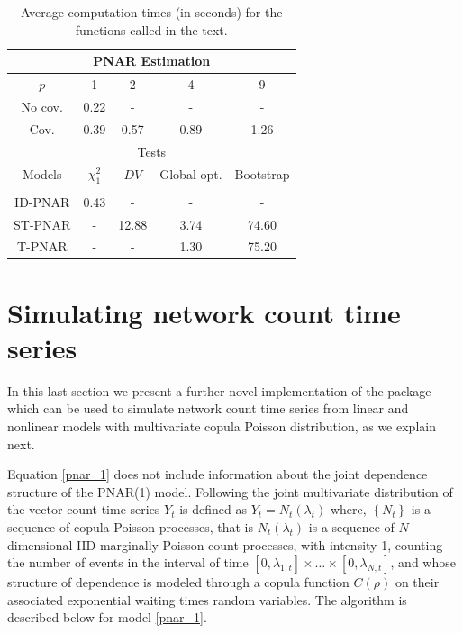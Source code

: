 \begin{table}[H]
	\centering
	\caption{Average computation times (in seconds) for the functions called in the text.}
	\begin{tabular}{ccccc}
		\toprule
		\multicolumn{5}{c}{PNAR Estimation}  \\
		\midrule
		$p$ & 1 & 2 & 4 & 9  \\ %
		\midrule
		No cov. & 0.22  & - & - & - \\
		Cov. & 0.39 & 0.57 & 0.89 & 1.26 \\ %
		\midrule
		\multicolumn{5}{c}{Tests}  \\
		\midrule
		Models & $\chi^2_1$ & $DV$ & Global opt. & Bootstrap \\ \\
		ID-PNAR & 0.43 & - & - & - \\
		ST-PNAR & - & 12.88 & 3.74 & 74.60 \\
		T-PNAR & - & - & 1.30 & 75.20 \\
		\bottomrule
		
	\end{tabular}
	\label{comp_times}
\end{table}


\section{Simulating network count time series}
\label{sec: Generate data}

In this last section we present a further novel implementation of the  package 
which can be used to simulate  network count time series from linear and nonlinear models with multivariate copula Poisson distribution, as we explain next. 

Equation \eqref{pnar_1} does not include information about the joint dependence structure of the PNAR(1) model. 
Following \cite{fok2020} the joint multivariate distribution of the  vector count time series $Y_t$ is defined as $Y_t=N_t(\lambda_t)$ where, $\left\lbrace N_t \right\rbrace $ is a sequence of  copula-Poisson processes, that is   $N_t(\lambda_t)$ is a sequence of $N$-dimensional IID  marginally Poisson count processes, with intensity 1, counting the number of events in the interval of time $[0,\lambda_{1,t}]\times\dots\times[0,\lambda_{N,t}]$, and whose structure of dependence is modeled through a copula function $C(\rho)$ on their associated exponential waiting times random variables. The algorithm is described below for model \eqref{pnar_1}.


